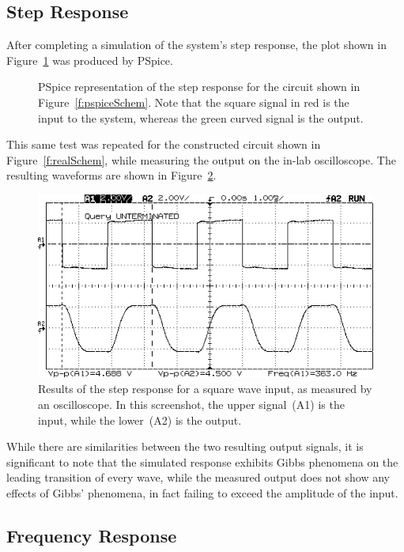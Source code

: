 \subsection{Step Response}
After completing a simulation of the system's step response, the plot shown
in Figure~\ref{f:stepSim} was produced by PSpice.
%
\begin{figure}[H]
	\centering
	
	\parbox{.6\textwidth}{
	\caption[Simulated Step Response]{PSpice representation of the step
	response for the circuit shown in Figure~\ref{f:pspiceSchem}.  Note that
	the square signal in red is the input to the system, whereas the green
	curved signal is the output.}
	\label{f:stepSim}}
\end{figure}
%
This same test was repeated for the constructed circuit shown in
Figure~\ref{f:realSchem}, while measuring the output on the in-lab
oscilloscope.  The resulting waveforms are shown in Figure~\ref{f:stepReal}.
%
\begin{figure}[H]
	\centering
	\includegraphics[width=.8\textwidth]{img/shot/squareWaveShot.png}
	\parbox{.6\textwidth}{
	\caption[Measured Step Response]{Results of the step response for a
	square wave input, as measured by an oscilloscope.  In this screenshot, the
	upper signal~(A1) is the input, while the lower~(A2) is the output.}
	\label{f:stepReal}}
\end{figure}
%
While there are similarities between the two resulting output signals, it is
significant to note that the simulated response exhibits Gibbs phenomena on the
leading transition of every wave, while the measured output does not show any
effects of Gibbs' phenomena, in fact failing to exceed the amplitude of the
input.

\subsection{Frequency Response}
\begin{figure}[H]
	\centering
	
\end{figure}

\begin{figure}[H]
	\centering
	
\end{figure}

\begin{figure}[H]
	\centering
	
\end{figure}

\begin{figure}[H]
	\centering
	
\end{figure}
